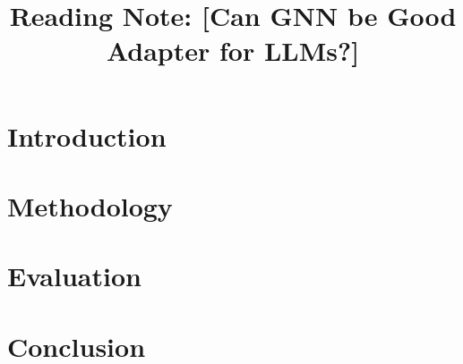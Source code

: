 \documentclass{article}
\title{Reading Note: [Can GNN be Good Adapter for LLMs?]}
\begin{document}
\maketitle

\section{Introduction}


\section{Methodology}

\section{Evaluation}


\section{Conclusion}


\end{document}
